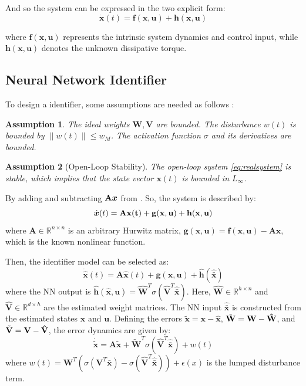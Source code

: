 \documentclass[10pt,twocolumn]{ICCAS}
\newcommand{\R}{\mathbb{R}}
\newcommand{\xtilde}{\tilde{\bm{x}}}
\newcommand{\xhat}{\hat{\bm{x}}}
\newcommand{\xbar}{\bar{\bm{x}}}
\newcommand{\xhatbar}{\hat{\bar{\bm{x}}}}
\newcommand{\Wtilde}{\tilde{\mathbf{W}}}
\newcommand{\What}{\hat{\mathbf{W}}}
\newcommand{\Vtilde}{\tilde{\mathbf{V}}}
\newcommand{\Vhat}{\hat{\mathbf{V}}}
\newtheorem{assumption}{Assumption}
\begin{document}
And so the system can be expressed in the two explicit form:
\begin{equation}
    \dot{\bm{x}}(t) = \bm{f}(\bm{x}, \bm{u}) + \bm{h}(\bm{x}, \bm{u})
    \label{eq:realsystem}
\end{equation}

where $\bm{f}(\bm{x}, \bm{u})$ represents the intrinsic system dynamics and control input, while $\bm{h}(\bm{x}, \bm{u})$ denotes the unknown dissipative torque.\\
\subsection{Neural Network Identifier}
To design a identifier, some assumptions are needed as follows : 
\begin{assumption}
The ideal weights $\mathbf{W}, \mathbf{V}$ are bounded. The disturbance $w(t)$ is bounded by $\|w(t)\| \le w_M$. The activation function $\sigma$ and its derivatives are bounded.\\
\end{assumption}

\begin{assumption}[Open-Loop Stability]
The open-loop system \eqref{eq:realsystem} is stable, which implies that the state vector $\bm{x}(t)$ is bounded in $L_\infty$.\\ 
\end{assumption}
By adding and subtracting ${\bf{A}}\bm{x}$ from . So, the system is described by:
\begin{equation}
    \dot{\bm{x}}(t) = \bf{A}\bm{x}(t) + \bm{g}(\bm{x}, \bm{u}) + \bm{h}(\bm{x}, \bm{u})
    \label{eq:system}
\end{equation}
where $\mathbf{A} \in \R^{n \times n}$ is an arbitrary Hurwitz matrix, $\bm{g}(\bm{x},\bm{u}) = \bm{f}(\bm{x}, \bm{u}) - {\mathbf{A}} \bm{x} $, which is the known nonlinear function.

Then, the identifier model can be selected as:
\begin{equation}
    \dot{\xhat}(t) = {\mathbf{A}}\bm{\xhat}(t) + \bm{g}(\bm{x}, \bm{u}) + \bm{\hat{h}}(\xhatbar)
    \label{eq:identifier}
\end{equation}
where the NN output is $\bm{\hat{h}}(\bm{\hat{x}},\bm{u}) = \What^T \sigma(\Vhat^T \xhatbar)$. Here, $\What \in \R^{h \times n}$ and $\Vhat \in \R^{d \times h}$ are the estimated weight matrices. The NN input $\xhatbar$ is constructed from the estimated states $\xhat$ and $\bm{u}$.
Defining the errors $\xtilde = \bm{x} - \xhat$, $\Wtilde = \bf{W} - \What$, and $\Vtilde = \bf{V} - \Vhat$, the error dynamics are given by:
\begin{equation}
    \dot{\xtilde} = {\mathbf{A}}\bm{\xtilde} + {\Wtilde}^{T} \sigma(\Vhat^T \bm{\xhatbar}) + w(t)
    \label{eq:error_dyn_final}
\end{equation}
where $w(t) = {\mathbf{W}}^T\left(\sigma({\mathbf{V}}^T\bm{\xbar}) - \sigma(\Vhat^T\xhatbar)\right) + \epsilon(x)$ is the lumped disturbance term.
\end{document}
